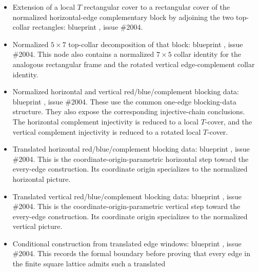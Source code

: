 \documentclass{article}
\begin{document}
\begin{itemize}
          ,
          using the cover definition
          , issue \#2004.
    \item Extension of a local $T$ rectangular cover to a rectangular cover of
          the normalized horizontal-edge complementary block by adjoining the
          two top-collar rectangles: blueprint
          , issue
          \#2004.
    \item Normalized $5\times7$ top-collar decomposition of that block:
          blueprint
          , issue
          \#2004. This node also contains a normalized $7\times5$
          collar identity for the analogous rectangular frame and the rotated
          vertical edge-complement collar identity.
    \item Normalized horizontal and vertical red/blue/complement blocking data:
          blueprint
          , issue
          \#2004. These use the common one-edge blocking-data structure.
          They also expose the corresponding injective-chain conclusions. The
          horizontal complement injectivity is reduced to a local $T$-cover,
          and the vertical complement injectivity is reduced to a rotated
          local $T$-cover.
    \item Translated horizontal red/blue/complement blocking data:
          blueprint
          ,
          issue \#2004. This is the coordinate-origin-parametric horizontal
          step toward the every-edge construction. Its coordinate origin
          specializes to the normalized horizontal picture.
    \item Translated vertical red/blue/complement blocking data:
          blueprint
          ,
          issue \#2004. This is the coordinate-origin-parametric vertical
          step toward the every-edge construction. Its coordinate origin
          specializes to the normalized vertical picture.
    \item Conditional construction from translated edge windows:
          blueprint
          ,
          issue \#2004. This records the formal boundary before proving that
          every edge in the finite square lattice admits such a translated

\end{itemize}
\end{document}
